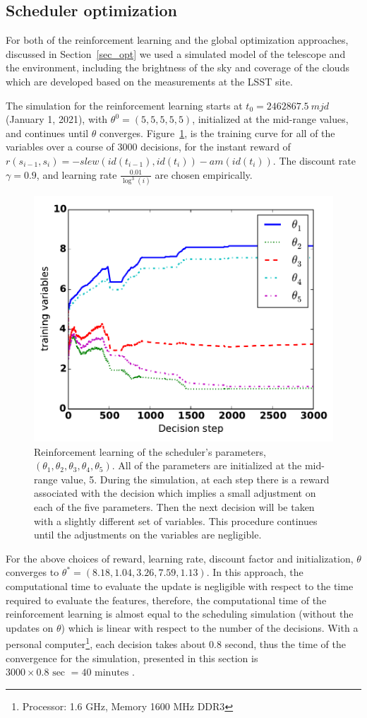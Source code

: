 \documentclass[12pt]{aastex62}
\theoremstyle{definition}
\begin{document}
\subsection{Scheduler optimization}\label{sec_lsst_opt}
For both of the reinforcement learning and the global optimization approaches, discussed in Section~\ref{sec_opt} we used a simulated model of the telescope \citep{2014SPIE.9150E..14C} and the environment, including the brightness of the sky and coverage of the clouds which are developed based on the measurements at the LSST site. 

The simulation for the reinforcement learning starts at $t_0 = 2462867.5~mjd$ (January 1, 2021), with $\theta^0 = (5,5,5,5,5)$, initialized at the mid-range values, and continues until $\theta$ converges. Figure~\ref{fig_theta_conv}, is the training curve for all of the variables over a course of 3000 decisions, for the instant reward of $r(s_{i-1}, s_i) = -slew(id(t_{i-1}), id(t_{i})) - am(id(t_i))$. The discount rate $\gamma = 0.9$, and learning rate $\frac{0.01}{\log^3(i)}$ are chosen empirically. 

\begin{figure}[h!]
\begin{center}
\includegraphics[width=0.5\linewidth]{Figures/TDcurve.pdf}
\end{center}
\caption{Reinforcement learning of the scheduler's parameters, $(\theta_1,\theta_2,\theta_3,\theta_4,\theta_5)$. All of the parameters are initialized at the mid-range value, 5. During the simulation, at each step there is a reward associated with the decision which implies a small adjustment on each of the five parameters. Then the next decision will be taken with a slightly different set of variables. This procedure continues until the adjustments on the variables are negligible.}
\label{fig_theta_conv}
\end{figure}

For the above choices of reward, learning rate, discount factor and initialization, $\theta$ converges to $\theta^* = (8.18,  1.04,  3.26,  7.59,  1.13)$.
In this approach, the computational time to evaluate the update is negligible with respect to the time required to evaluate the features, therefore, the computational time of the reinforcement learning is almost equal to the scheduling simulation (without the updates on $\theta$) which is linear with respect to the number of the decisions. With a personal computer\footnote{Processor: 1.6 GHz, Memory 1600 MHz DDR3}, each decision takes about $0.8$ second, thus the time of the convergence for the simulation, presented in this section is $3000\times 0.8 \text{ sec } = 40 \text{ minutes }$.
\end{document}
